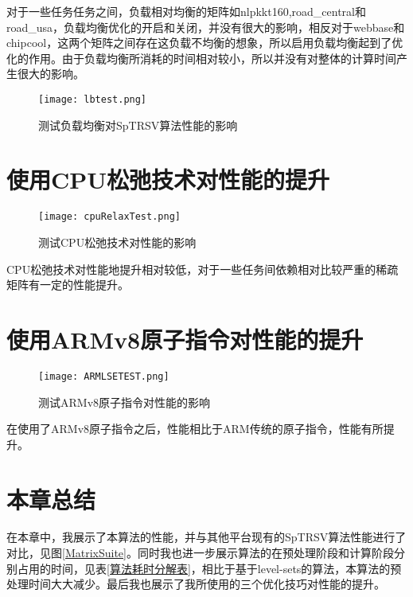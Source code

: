 对于一些任务任务之间，负载相对均衡的矩阵如nlpkkt160,road\_central和road\_usa，负载均衡优化的开启和关闭，并没有很大的影响，相反对于webbase和chipcool，这两个矩阵之间存在这负载不均衡的想象，所以启用负载均衡起到了优化的作用。由于负载均衡所消耗的时间相对较小，所以并没有对整体的计算时间产生很大的影响。

\begin{figure}[htbp]
    \centering
    \texttt{[image: lbtest.png]}
    \caption{测试负载均衡对SpTRSV算法性能的影响}
    \label{测试负载均衡对SpTRSV算法性能的影响}
\end{figure}

\section{使用CPU松弛技术对性能的提升}

\begin{figure}[htbp]
    \centering
    \texttt{[image: cpuRelaxTest.png]}
    \caption{测试CPU松弛技术对性能的影响}
    \label{测试CPU松弛技术对性能的影响}
\end{figure}
CPU松弛技术对性能地提升相对较低，对于一些任务间依赖相对比较严重的稀疏矩阵有一定的性能提升。

\section{使用ARMv8原子指令对性能的提升}

\begin{figure}[htbp]
    \centering
    \texttt{[image: ARMLSETEST.png]}
    \caption{测试ARMv8原子指令对性能的影响}
    \label{测试ARMv8原子指令对性能的影响}
\end{figure}

在使用了ARMv8原子指令之后，性能相比于ARM传统的原子指令，性能有所提升。





\section{本章总结}

在本章中，我展示了本算法的性能，并与其他平台现有的SpTRSV算法性能进行了对比，见图\ref{MatrixSuite}。同时我也进一步展示算法的在预处理阶段和计算阶段分别占用的时间，见表\ref{算法耗时分解表}，相比于基于level-sets的算法，本算法的预处理时间大大减少。最后我也展示了我所使用的三个优化技巧对性能的提升。




\endinput